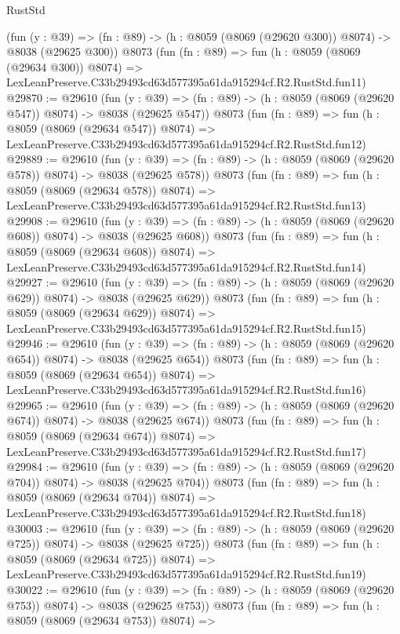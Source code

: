\begin{lexlean}{RustStd}
\begin{coremodule}
    (fun (y : @39) => (fn : @89) -> (h : @8059 (@8069 (@29620 @300)) @8074) -> @8038 (@29625 @300))
    @8073
    (fun (fn : @89) =>
    fun (h : @8059 (@8069 (@29634 @300)) @8074) =>
    LexLeanPreserve.C33b29493cd63d577395a61da915294cf.R2.RustStd.fun11)
@29870 := @29610
    (fun (y : @39) => (fn : @89) -> (h : @8059 (@8069 (@29620 @547)) @8074) -> @8038 (@29625 @547))
    @8073
    (fun (fn : @89) =>
    fun (h : @8059 (@8069 (@29634 @547)) @8074) =>
    LexLeanPreserve.C33b29493cd63d577395a61da915294cf.R2.RustStd.fun12)
@29889 := @29610
    (fun (y : @39) => (fn : @89) -> (h : @8059 (@8069 (@29620 @578)) @8074) -> @8038 (@29625 @578))
    @8073
    (fun (fn : @89) =>
    fun (h : @8059 (@8069 (@29634 @578)) @8074) =>
    LexLeanPreserve.C33b29493cd63d577395a61da915294cf.R2.RustStd.fun13)
@29908 := @29610
    (fun (y : @39) => (fn : @89) -> (h : @8059 (@8069 (@29620 @608)) @8074) -> @8038 (@29625 @608))
    @8073
    (fun (fn : @89) =>
    fun (h : @8059 (@8069 (@29634 @608)) @8074) =>
    LexLeanPreserve.C33b29493cd63d577395a61da915294cf.R2.RustStd.fun14)
@29927 := @29610
    (fun (y : @39) => (fn : @89) -> (h : @8059 (@8069 (@29620 @629)) @8074) -> @8038 (@29625 @629))
    @8073
    (fun (fn : @89) =>
    fun (h : @8059 (@8069 (@29634 @629)) @8074) =>
    LexLeanPreserve.C33b29493cd63d577395a61da915294cf.R2.RustStd.fun15)
@29946 := @29610
    (fun (y : @39) => (fn : @89) -> (h : @8059 (@8069 (@29620 @654)) @8074) -> @8038 (@29625 @654))
    @8073
    (fun (fn : @89) =>
    fun (h : @8059 (@8069 (@29634 @654)) @8074) =>
    LexLeanPreserve.C33b29493cd63d577395a61da915294cf.R2.RustStd.fun16)
@29965 := @29610
    (fun (y : @39) => (fn : @89) -> (h : @8059 (@8069 (@29620 @674)) @8074) -> @8038 (@29625 @674))
    @8073
    (fun (fn : @89) =>
    fun (h : @8059 (@8069 (@29634 @674)) @8074) =>
    LexLeanPreserve.C33b29493cd63d577395a61da915294cf.R2.RustStd.fun17)
@29984 := @29610
    (fun (y : @39) => (fn : @89) -> (h : @8059 (@8069 (@29620 @704)) @8074) -> @8038 (@29625 @704))
    @8073
    (fun (fn : @89) =>
    fun (h : @8059 (@8069 (@29634 @704)) @8074) =>
    LexLeanPreserve.C33b29493cd63d577395a61da915294cf.R2.RustStd.fun18)
@30003 := @29610
    (fun (y : @39) => (fn : @89) -> (h : @8059 (@8069 (@29620 @725)) @8074) -> @8038 (@29625 @725))
    @8073
    (fun (fn : @89) =>
    fun (h : @8059 (@8069 (@29634 @725)) @8074) =>
    LexLeanPreserve.C33b29493cd63d577395a61da915294cf.R2.RustStd.fun19)
@30022 := @29610
    (fun (y : @39) => (fn : @89) -> (h : @8059 (@8069 (@29620 @753)) @8074) -> @8038 (@29625 @753))
    @8073
    (fun (fn : @89) =>
    fun (h : @8059 (@8069 (@29634 @753)) @8074) =>

\end{coremodule}
\end{lexlean}
